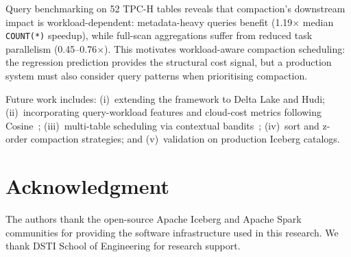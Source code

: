 \documentclass[conference, 10pt]{IEEEtran}
\begin{document}
Query benchmarking on 52 TPC-H tables reveals that compaction's downstream
impact is workload-dependent: metadata-heavy queries benefit (1.19$\times$
median \texttt{COUNT(*)} speedup), while full-scan aggregations suffer from
reduced task parallelism (0.45--0.76$\times$). This motivates
workload-aware compaction scheduling: the regression prediction
provides the structural cost signal, but a production system must also
consider query patterns when prioritising compaction.

Future work
includes: (i)~extending the framework to Delta Lake and Hudi;
(ii)~incorporating query-workload features and cloud-cost metrics
following Cosine~\cite{chatterjee2022cosine}; (iii)~multi-table scheduling
via contextual bandits~\cite{marcus2021bao};
(iv)~sort and z-order compaction strategies;
and (v)~validation on production Iceberg catalogs.

\section*{Acknowledgment}
The authors thank the open-source Apache Iceberg and Apache Spark
communities for providing the software infrastructure used in this
research. We thank DSTI School of Engineering for research support.



\end{document}
